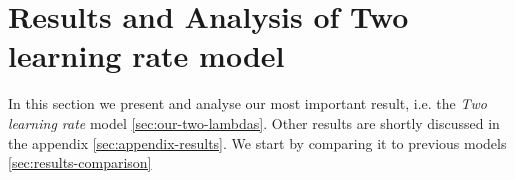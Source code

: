 
\section{Results and Analysis of Two learning rate model} %
\label{sec:results} 

In this section we present and analyse our most important result, i.e. the \emph{Two learning rate} model \ref{sec:our-two-lambdas}. Other results are shortly discussed in the appendix \ref{sec:appendix-results}. We start by comparing it to previous models \ref{sec:results-comparison}

 

 


